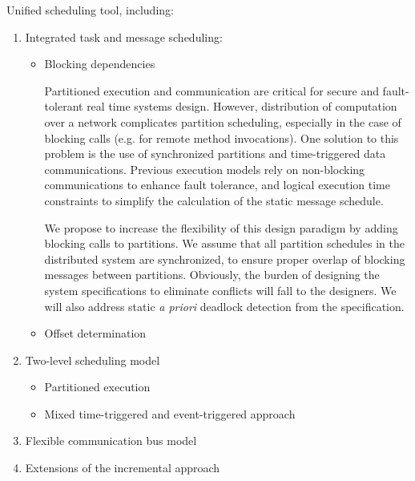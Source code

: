 
Unified scheduling tool, including:

\begin{enumerate}

\item Integrated task and message scheduling:

\begin{itemize}
\item Blocking dependencies

Partitioned execution and communication are critical for secure and 
fault-tolerant real time systems design.  However, distribution of computation
over a network complicates partition scheduling, especially in the case of
blocking calls (e.g. for remote method invocations).   One solution to this
problem is the use of synchronized partitions and time-triggered data 
communications.  Previous execution models rely on non-blocking 
communications to enhance fault tolerance, and logical execution time 
constraints to simplify the calculation of the static message schedule.

We propose to increase the flexibility of this design paradigm by adding 
blocking calls to partitions.  We assume that all partition schedules in the
distributed system are synchronized, to ensure proper overlap of blocking
messages between partitions.  Obviously, the burden of designing the system
specifications to eliminate conflicts will fall to the designers.  We will 
also address static \emph{a priori} deadlock detection from the specification.

\item Offset determination
\end{itemize}

\item Two-level scheduling model

\begin{itemize}
\item Partitioned execution
\item Mixed time-triggered and event-triggered approach
\end{itemize}

\item Flexible communication bus model

\item Extensions of the incremental approach

\end{enumerate}



